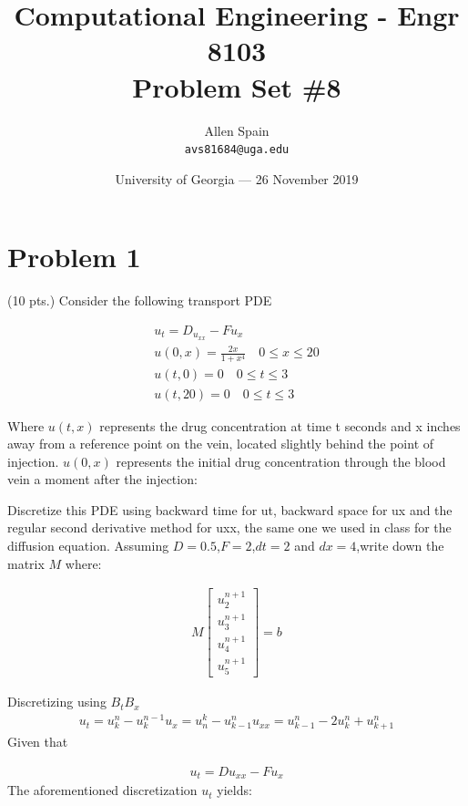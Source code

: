 \documentclass{article}
\title{Computational Engineering - Engr 8103 \\ Problem Set \#8} %
\author{Allen Spain\\ \texttt{avs81684@uga.edu}} %
\date{University of Georgia --- 26 November 2019 } %
\begin{document}
\maketitle %


\section*{Problem 1} %
(10 pts.) Consider the following transport PDE

\begin{align*}
u_{t} = D_{u_{xx}} - Fu_{x} \\
u(0,x) = \frac{2x}{1+x^{4}} \quad 0 \leq x \leq 20 \\
u(t,0) = 0 \quad 0 \leq t \leq 3 \\
u(t,20) = 0 \quad 0 \leq t \leq 3
\end{align*}

\noindent
Where $u(t, x)$ represents the drug concentration at time t seconds and x inches away from a reference point on the vein, located slightly behind the point of injection. $u(0, x)$ represents the initial drug concentration through the blood vein a moment after the injection:


Discretize this PDE using backward time for ut, backward space for ux and the regular second derivative method for uxx, the same one we used in class for the diffusion equation. Assuming $D=0.5$,$F=2$,$dt=2$ and $dx=4$,write down the matrix $M$ where:

\begin{align*}
M\begin{bmatrix}u^{n+1}_{2}\\u^{n+1}_{3}\\u^{n+1}_{4}\\u^{n+1}_{5}\end{bmatrix} = b
\end{align*}

Discretizing using $B_{t}B_{x}$
\begin{align*}
u_{t} = u^{n}_{k} - u^{n-1}_{k}
u_{x} = u^{k}_{n} - u^{n}_{k-1}
u_{xx} = u^{n}_{k-1} - 2u^{n}_{k} + u^{n}_{k+1}
\end{align*}
Given that

\begin{align*}
u_{t} = Du_{xx} - Fu_{x}
\end{align*}
The aforementioned discretization $u_{t}$ yields:
\end{document}
